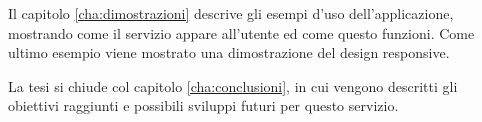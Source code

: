 Il capitolo \ref{cha:dimostrazioni} descrive gli esempi d'uso dell'applicazione, mostrando come il servizio appare all'utente ed come questo funzioni. Come ultimo esempio viene mostrato una dimostrazione del design responsive.

La tesi si chiude col capitolo \ref{cha:conclusioni}, in cui vengono descritti gli obiettivi raggiunti e possibili sviluppi futuri per questo servizio.